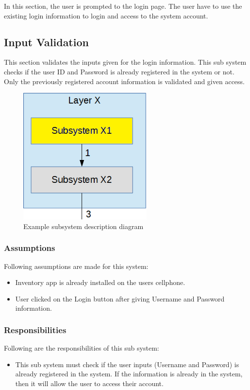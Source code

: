 In this section, the user is prompted to the login page. The user have to use the existing login information to login and access to the system account. 

\subsection{Input Validation}
This section validates the inputs given for the login information. This sub system checks if the user ID and Password is already registered in the system or not. Only the previously registered account information is validated and given access.

\begin{figure}[h!]
	\centering
 	\includegraphics[width=0.60\textwidth]{images/subsystem}
 \caption{Example subsystem description diagram}
\end{figure}

\subsubsection{Assumptions}
Following assumptions are made for this system:
\begin{itemize}
    \item Inventory app is already installed on the users cellphone.
    \item User clicked on the Login button after giving Username and Password information.
\end{itemize}

\subsubsection{Responsibilities}
Following are the responsibilities of this sub system:
\begin{itemize}
    \item This sub system must check if the user inputs (Username and Password) is already registered in the system. If the information is already in the system, then it will allow the user to access their account.
\end{itemize}

